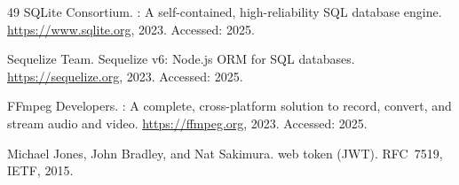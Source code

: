 \begin{thebibliography}{49}
{SQLite Consortium}.
: A self-contained, high-reliability {SQL} database engine.
\newblock \url{https://www.sqlite.org}, 2023.
\newblock Accessed: 2025.

{Sequelize Team}.
\newblock Sequelize v6: {Node.js} {ORM} for {SQL} databases.
\newblock \url{https://sequelize.org}, 2023.
\newblock Accessed: 2025.

{FFmpeg Developers}.
: A complete, cross-platform solution to record, convert, and stream audio and video.
\newblock \url{https://ffmpeg.org}, 2023.
\newblock Accessed: 2025.

Michael Jones, John Bradley, and Nat Sakimura.
 web token ({JWT}).
\newblock RFC~7519, IETF, 2015.

\end{thebibliography}

